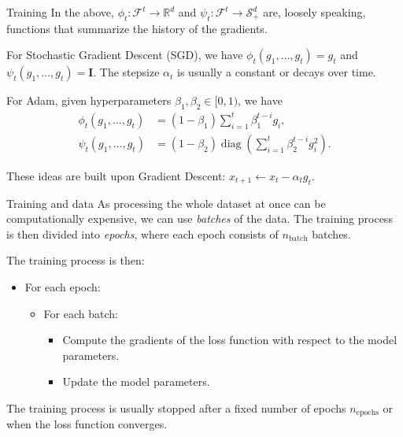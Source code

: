 \documentclass{beamer}
\newcommand{\I}{\mathbf{I}}
\begin{document}
\begin{frame}{Training}
    In the above, \(\phi_t: \mathcal{F}^t \to \mathbb{R}^d\) and \(\psi_t: \mathcal{F}^t \to \mathcal{S}^d_+\) are, loosely speaking, functions that summarize the history of the gradients.

    \pause

    For Stochastic Gradient Descent (SGD), we have \(\phi_t(g_1, \ldots, g_t) = g_t\) and \(\psi_t(g_1, \ldots, g_t) = \I\).
    The stepsize \(\alpha_t\) is usually a constant or decays over time.

    \pause

    For Adam, given hyperparameters \(\beta_1, \beta_2 \in [0,1)\), we have
    \begin{align*}
        \phi_t(g_1, \ldots, g_t) &= (1 - \beta_1) \sum_{i=1}^{t} \beta_1^{t-i} g_i, \\
        \psi_t(g_1, \ldots, g_t) &= (1 - \beta_2) \operatorname{diag}\left( \sum_{i=1}^{t} \beta_2^{t-i} g_i^2 \right).
    \end{align*}

    \pause

    These ideas are built upon Gradient Descent: \(x_{t+1} \gets x_t - \alpha_t g_t\).
\end{frame}

\begin{frame}{Training and data}
    As processing the whole dataset at once can be computationally expensive, we can use \emph{batches} of the data.
    The training process is then divided into \emph{epochs}, where each epoch consists of \(n_{\mathrm{batch}}\) batches.

    \pause

    The training process is then:
    \begin{itemize}
        \item For each epoch:
        \begin{itemize}
            \item For each batch:
            \begin{itemize}
                \item Compute the gradients of the loss function with respect to the model parameters.
                \item Update the model parameters.
            \end{itemize}
        \end{itemize}
    \end{itemize}

    \pause

    The training process is usually stopped after a fixed number of epochs \(n_{\mathrm{epochs}}\) or when the loss function converges.
\end{frame}
\end{document}
